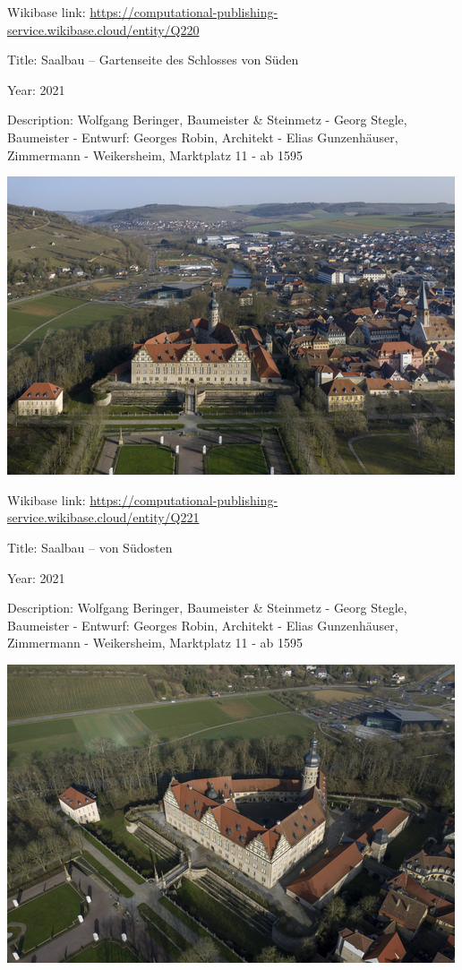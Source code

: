 \documentclass[
  letterpaper,
]{book}
\begin{document}
Wikibase link:
\url{https://computational-publishing-service.wikibase.cloud/entity/Q220}

Title: Saalbau -- Gartenseite des Schlosses von Süden

Year: 2021

Description: Wolfgang Beringer, Baumeister \& Steinmetz - Georg Stegle,
Baumeister - Entwurf: Georges Robin, Architekt - Elias Gunzenhäuser,
Zimmermann - Weikersheim, Marktplatz 11 - ab 1595

\includegraphics{paintings_files/figure-pdf/cell-3-output-12.png}

Wikibase link:
\url{https://computational-publishing-service.wikibase.cloud/entity/Q221}

Title: Saalbau -- von Südosten

Year: 2021

Description: Wolfgang Beringer, Baumeister \& Steinmetz - Georg Stegle,
Baumeister - Entwurf: Georges Robin, Architekt - Elias Gunzenhäuser,
Zimmermann - Weikersheim, Marktplatz 11 - ab 1595

\includegraphics{paintings_files/figure-pdf/cell-3-output-14.png}
\end{document}
